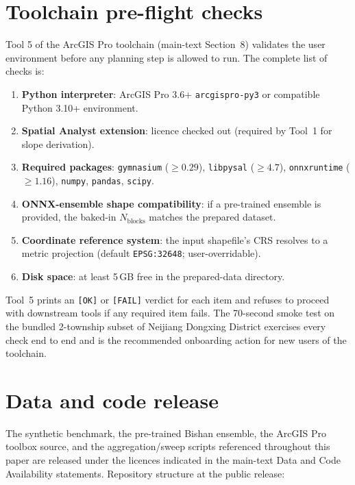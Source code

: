 \documentclass[11pt]{article}
\begin{document}
\section{Toolchain pre-flight checks}\label{si:s4-toolchain}

Tool 5 of the ArcGIS Pro toolchain (main-text Section~8) validates the user environment before any planning step is allowed to run. The complete list of checks is:

\begin{enumerate}
\item \textbf{Python interpreter}: ArcGIS Pro 3.6+ \texttt{arcgispro-py3} or compatible Python 3.10+ environment.
\item \textbf{Spatial Analyst extension}: licence checked out (required by Tool~1 for slope derivation).
\item \textbf{Required packages}: \texttt{gymnasium} ($\geq 0.29$), \texttt{libpysal} ($\geq 4.7$), \texttt{onnxruntime} ($\geq 1.16$), \texttt{numpy}, \texttt{pandas}, \texttt{scipy}.
\item \textbf{ONNX-ensemble shape compatibility}: if a pre-trained ensemble is provided, the baked-in $N_{\text{blocks}}$ matches the prepared dataset.
\item \textbf{Coordinate reference system}: the input shapefile's CRS resolves to a metric projection (default \texttt{EPSG:32648}; user-overridable).
\item \textbf{Disk space}: at least 5\,GB free in the prepared-data directory.
\end{enumerate}

Tool~5 prints an \texttt{[OK]} or \texttt{[FAIL]} verdict for each item and refuses to proceed with downstream tools if any required item fails. The 70-second smoke test on the bundled 2-township subset of Neijiang Dongxing District exercises every check end to end and is the recommended onboarding action for new users of the toolchain.

\section{Data and code release}\label{si:s5-release}

The synthetic benchmark, the pre-trained Bishan ensemble, the ArcGIS Pro toolbox source, and the aggregation/sweep scripts referenced throughout this paper are released under the licences indicated in the main-text Data and Code Availability statements. Repository structure at the public release:
\end{document}
